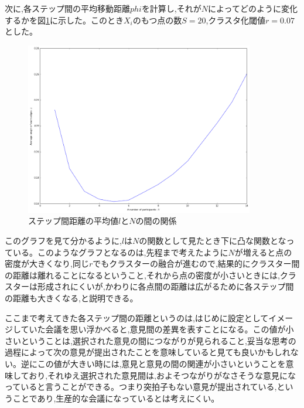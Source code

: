 次に,各ステップ間の平均移動距離$phi$を計算し,それが$N$によってどのように変化するかを図\ref{fig:f24}に示した。このとき$X_{i}$のもつ点の数$S=20$,クラスタ化閾値$r=0.07$とした。
\begin{figure}[H]
    \begin{center}
        \includegraphics[width=10cm]{../img/N_l_2.png}
        \caption{ステップ間距離の平均値$l$と$N$の間の関係}
        \label{fig:f24}
    \end{center}
\end{figure}
このグラフを見て分かるように,$l$は$N$の関数として見たとき下に凸な関数となっている。このようなグラフとなるのは,先程まで考えたように$N$が増えると点の密度が大きくなり,同じ$r$でもクラスターの融合が進むので,結果的にクラスター間の距離は離れることになるということ,それから点の密度が小さいときには,クラスターは形成されにくいが,かわりに各点間の距離は広がるために各ステップ間の距離も大きくなる,と説明できる。

ここまで考えてきた各ステップ間の距離というのは,はじめに設定としてイメージしていた会議を思い浮かべると,意見間の差異を表すことになる。この値が小さいということは,選択された意見の間につながりが見られること,妥当な思考の過程によって次の意見が提出されたことを意味していると見ても良いかもしれない。逆にこの値が大きい時には,意見と意見の間の関連が小さいということを意味しており,それゆえ選択された意見間は,およそつながりがなさそうな意見になっていると言うことができる。つまり突拍子もない意見が提出されている,ということであり,生産的な会議になっているとは考えにくい。
